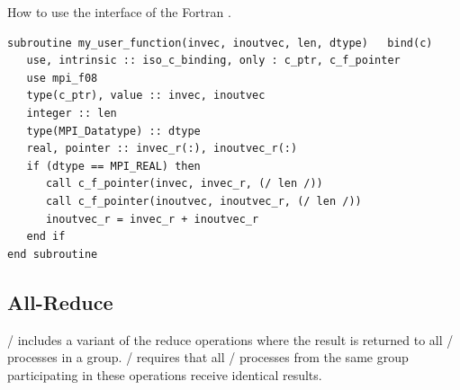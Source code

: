 \begin{example}
\label{coll-exX-fortran}
%
%
How to use the  interface of the Fortran .
\begin{lstlisting}[language={[MPI08]Fortran}]
subroutine my_user_function(invec, inoutvec, len, dtype)   bind(c)
   use, intrinsic :: iso_c_binding, only : c_ptr, c_f_pointer
   use mpi_f08
   type(c_ptr), value :: invec, inoutvec
   integer :: len
   type(MPI_Datatype) :: dtype
   real, pointer :: invec_r(:), inoutvec_r(:)
   if (dtype == MPI_REAL) then
      call c_f_pointer(invec, invec_r, (/ len /))
      call c_f_pointer(inoutvec, inoutvec_r, (/ len /))
      inoutvec_r = invec_r + inoutvec_r
   end if
end subroutine
\end{lstlisting}
\end{example}

\subsection{All-Reduce}
\label{subsec:coll-all-reduce}

\MPI/ includes
a variant
of the reduce operations
where the result is returned to all \MPI/ processes in
a
group.
\MPI/ requires that all \MPI/ processes
from the same group
participating in these operations
receive identical results.

